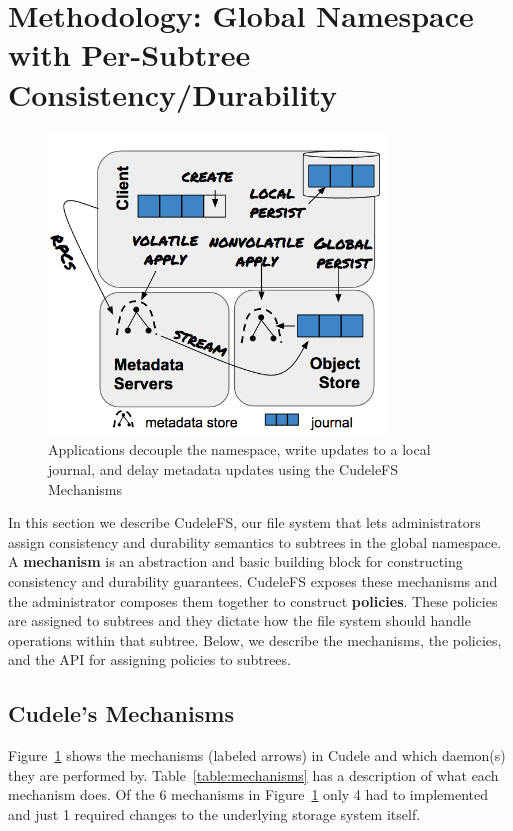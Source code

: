 \section{Methodology: Global Namespace with Per-Subtree Consistency/Durability}
\label{sec:methodology-decoupled-namespaces}

\begin{figure}[tb]
\centering
\includegraphics[width=90mm]{figures/fig-decouple.png}
\caption{Applications decouple the namespace, write updates to a local journal,
and delay metadata updates using the CudeleFS Mechanisms }\label{fig:decouple}
\end{figure}

In this section we describe CudeleFS, our file system that lets administrators
assign consistency and durability semantics to subtrees in the global
namespace. A \textbf{mechanism} is an abstraction and basic building block for
constructing consistency and durability guarantees. CudeleFS exposes these
mechanisms and the administrator composes them together to construct
\textbf{policies}. These policies are assigned to subtrees and they dictate how
the file system should handle operations within that subtree.  Below, we
describe the mechanisms, the policies, and the API for assigning policies to
subtrees.

\subsection{Cudele's Mechanisms}
\label{sec:cudeles-mechanisms}

Figure~\ref{fig:decouple} shows the mechanisms (labeled arrows) in Cudele and
which daemon(s) they are performed by.  Table~\ref{table:mechanisms} has a
description of what each mechanism does.  Of the 6 mechanisms in
Figure~\ref{fig:decouple} only 4 had to implemented and just 1 required changes to
the underlying storage system itself.  

